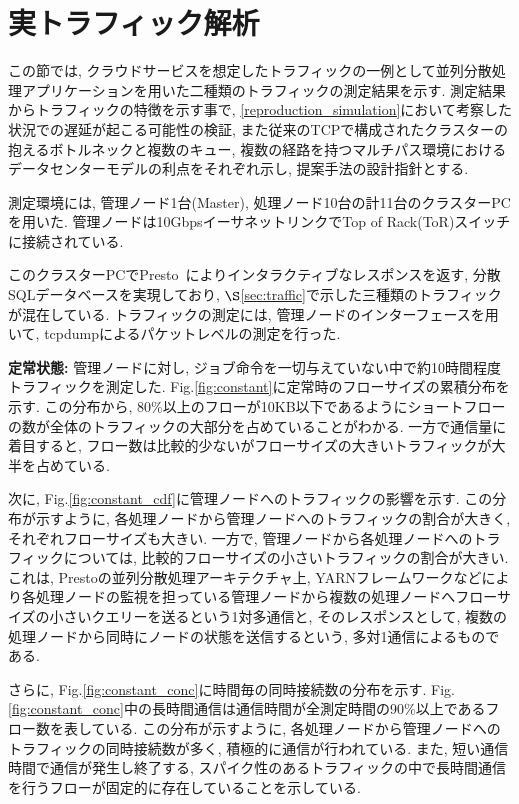 \section{実トラフィック解析}

この節では, クラウドサービスを想定したトラフィックの一例として並列分散処理アプリケーションを用いた二種類のトラフィックの測定結果を示す.
測定結果からトラフィックの特徴を示す事で, \ref{reproduction_simulation}において考察した状況での遅延が起こる可能性の検証,
また従来のTCPで構成されたクラスターの抱えるボトルネックと複数のキュー, 複数の経路を持つマルチパス環境におけるデータセンターモデルの利点をそれぞれ示し, 提案手法の設計指針とする.

測定環境には, 管理ノード1台(Master), 処理ノード10台の計11台のクラスターPCを用いた.
管理ノードは10GbpsイーサネットリンクでTop of Rack(ToR)スイッチに接続されている.

このクラスターPCでPresto~\cite{presto}によりインタラクティブなレスポンスを返す, 分散SQLデータベースを実現しており,
$\S $\ref{sec:traffic}で示した三種類のトラフィックが混在している.
トラフィックの測定には, 管理ノードのインターフェースを用いて, tcpdump\cite{tcpdump}によるパケットレベルの測定を行った.

{\bf 定常状態: }
管理ノードに対し, ジョブ命令を一切与えていない中で約10時間程度トラフィックを測定した.
Fig.\ref{fig:constant}に定常時のフローサイズの累積分布を示す.
この分布から, 80\%以上のフローが10KB以下であるようにショートフローの数が全体のトラフィックの大部分を占めていることがわかる.
一方で通信量に着目すると, フロー数は比較的少ないがフローサイズの大きいトラフィックが大半を占めている.

次に, Fig.\ref{fig:constant_cdf}に管理ノードへのトラフィックの影響を示す.
この分布が示すように, 各処理ノードから管理ノードへのトラフィックの割合が大きく, それぞれフローサイズも大きい.
一方で, 管理ノードから各処理ノードへのトラフィックについては, 比較的フローサイズの小さいトラフィックの割合が大きい.
これは, Prestoの並列分散処理アーキテクチャ上,
YARNフレームワークなどにより各処理ノードの監視を担っている管理ノードから複数の処理ノードへフローサイズの小さいクエリーを送るという1対多通信と,
そのレスポンスとして, 複数の処理ノードから同時にノードの状態を送信するという, 多対1通信によるものである.

さらに, Fig.\ref{fig:constant_conc}に時間毎の同時接続数の分布を示す.
Fig.\ref{fig:constant_conc}中の長時間通信は通信時間が全測定時間の90\%以上であるフロー数を表している.
この分布が示すように, 各処理ノードから管理ノードへのトラフィックの同時接続数が多く, 積極的に通信が行われている.
また, 短い通信時間で通信が発生し終了する, スパイク性のあるトラフィックの中で長時間通信を行うフローが固定的に存在していることを示している. 

